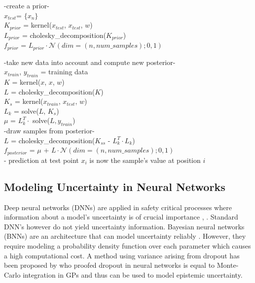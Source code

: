 \documentclass[a4paper,cleardoubleempty,BCOR1cm, 11pt]{report}
\begin{document}
\begin{algorithm}[ht]
\setlength{\leftskip}{4mm}
-create a prior-\\
$x_{test}$= $\lbrace x_n \rbrace$\\
$K_{prior}$ = kernel($x_{test}$, $x_{test}$, $w$)\\
$L_{prior}$ = cholesky\_decomposition($K_{prior}$)\\ %
$f_{prior}$ = $L_{prior} \cdot \mathcal{N}(dim=(n, num\_samples);0,1)$

-take new data into account and compute new posterior-\\
$x_{train}$, $y_{train}$ = training data\\
$K$ = kernel($x$, $x$, $w$)\\
$L$ = cholesky\_decomposition($K$)\\
$K_s$ = kernel($x_{train}$, $x_{test}$, $w$)\\
$L_k$ = solve($L$, $K_s$)\\
$\mu$ = $L_k^T \cdot$ solve($L, y_{train}$)\\

-draw samples from posterior-\\
$L$ = cholesky\_decomposition($K_{ss}$ - $L_k^T \cdot L_k$)\\
$f_{posterior}$ = $\mu$ + $L \cdot \mathcal{N}(dim=(n, num\_samples);0,1)$\\
- prediction at test point $x_i$ is now the sample's value at position $i$
\end{algorithm}




\subsection{Modeling Uncertainty in Neural Networks} %
Deep neural networks (DNNs) are applied in safety critical processes where information about a model's uncertainty is of crucial importance \cite{najafabadi2015deep}, \cite{krzywinski2013importance}. Standard DNN's however do not yield uncertainty information. Bayesian neural networks (BNNs) are an architecture that can model uncertainty reliably \cite{mullachery2018bayesian}. However, they require modeling a probability density function over each parameter which causes a high computational cost. A method using variance arising from dropout has been proposed by \citet{gal2016dropout} who proofed dropout in neural networks is equal to Monte-Carlo integration in GPs and thus can be used to model epistemic uncertainty.\\
\end{document}
